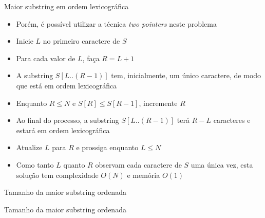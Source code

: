 \begin{frame}[fragile]{Maior substring em ordem lexicográfica}

    \begin{itemize}
        \item Porém, é possível utilizar a técnica \textit{two pointers} neste problema

        \item Inicie $L$ no primeiro caractere de $S$

        \item Para cada valor de $L$, faça $R = L + 1$

        \item A substring $S[L..(R - 1)]$ tem, inicialmente, um único caractere, de modo que
            está em ordem lexicográfica

        \item Enquanto $R\leq N$ e $S[R] \leq S[R-1]$, incremente $R$

        \item Ao final do processo, a substring $S[L..(R - 1)]$ terá $R - L$ caracteres e estará
            em ordem lexicográfica

        \item Atualize $L$ para $R$ e prossiga enquanto $L\leq N$

        \item Como tanto $L$ quanto $R$ observam cada caractere de $S$ uma única vez, esta 
            solução tem complexidade $O(N)$ e memória $O(1)$
    \end{itemize}

\end{frame}

\begin{frame}[fragile]{Tamanho da maior substring ordenada}
\end{frame}

\begin{frame}[fragile]{Tamanho da maior substring ordenada}
\end{frame}

